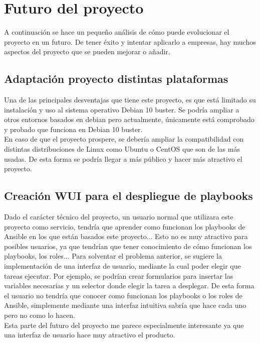 \section{Futuro del proyecto}
\begin{text}
        A continuación se hace un pequeño análisis de cómo puede evolucionar el proyecto en un futuro. De tener éxito y intentar aplicarlo a empresas, hay muchos aspectos del proyecto que se pueden mejorar o añadir. 
\end{text}
\subsection{Adaptación proyecto distintas plataformas}
\begin{text}
        Una de las principales desventajas que tiene este proyecto, es que está limitado su instalación y uso al sistema operativo Debian 10 buster. Se podría ampliar a otros entornos basados en debian pero actualmente, únicamente está comprobado y probado que funciona en Debian 10 buster. \\
        En caso de que el proyecto prospere, se debería ampliar la compatibilidad con distintas distribuciones de Linux como Ubuntu o CentOS que son de las más usadas. De esta forma se podría llegar a más público y hacer más atractivo el proyecto.
\end{text}

\subsection{Creación WUI para el despliegue de playbooks}
\begin{text}
        Dado el carácter técnico del proyecto, un usuario normal que utilizara este proyecto como servicio, tendría que aprender como funcionan los playbooks de Ansible en los que están basados este proyecto... Esto no es muy atractivo para posibles usuarios, ya que tendrían que tener conocimiento de cómo funcionan los playbooks, los roles... Para solventar el problema anterior, se sugiere la implementación de una interfaz de usuario, mediante la cual poder elegir que tareas ejecutar. Por ejemplo, se podrían crear formularios para insertar las variables necesarias y un selector donde elegir la tarea a desplegar. De esta forma el usuario no tendría que conocer como funcionan los playbooks o los roles de Ansible, simplemente mediante una interfaz intuitiva sabría que hace cada uno pero no como lo hacen. \\
        Esta parte del futuro del proyecto me parece especialmente interesante ya que una interfaz de usuario hace muy atractivo el producto.
\end{text}